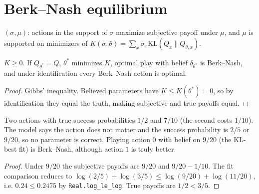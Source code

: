 \section{Berk--Nash equilibrium}
\label{sec:br-berknash}

\begin{definition}
\label{def:br-bn}
\leanok
$(\sigma,\mu)$: actions in the support of $\sigma$ maximize subjective payoff under $\mu$, and $\mu$ is supported on
minimizers of $K(\sigma,\theta)=\sum_x\sigma_x\mathrm{KL}(Q_x\|Q_{\theta,x})$.
\end{definition}

\begin{theorem}
\label{thm:br-bn-correct}
\leanok
{}
$K\ge0$. If $Q_{\theta^*}=Q$, $\theta^*$ minimizes $K$, optimal play with belief $\delta_{\theta^*}$ is Berk--Nash, and
under identification every Berk--Nash action is optimal.
\end{theorem}
\begin{proof}
\leanok
Gibbs' inequality. Believed parameters have $K\le K(\theta^*)=0$, so by identification they equal the truth,
making subjective and true payoffs equal.
\end{proof}

\begin{theorem}
\label{thm:br-bn-example}
\leanok
{}
Two actions with true success probabilities $1/2$ and $7/10$ (the second costs $1/10$). The model says the action
does not matter and the success probability is $2/5$ or $9/20$, so no parameter is correct. Playing action $0$ with
belief on $9/20$ (the KL-best fit) is Berk--Nash, although action $1$ is truly better.
\end{theorem}
\begin{proof}
\leanok
Under $9/20$ the subjective payoffs are $9/20$ and $9/20-1/10$. The fit comparison reduces to
$\log(2/5)+\log(3/5)\le\log(9/20)+\log(11/20)$, i.e. $0.24\le0.2475$ by \texttt{Real.log\_le\_log}. True payoffs are
$1/2<3/5$.
\end{proof}

